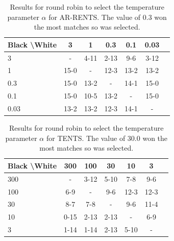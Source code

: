     \begin{table}[]
    \centering
        \begin{tabular}{l|cccccc}
            \textbf{Black \textbackslash White}     & 3  & 1   & 0.3   & 0.1    & 0.03    \\ 
            \hline
                                    3            & -     	&  4-11 		&  2-13 		& 9-6  		& 3-12  		\\
                                    1            &  15-0 		& -     	&  12-3		& 13-2  		&   13-2		\\
                                    0.3          &  15-0  	&  13-2  	&   -   &  14-1 		&  15-0 		\\
                                    0.1          &  15-0 		&   10-5		&   13-2		& -     	&  15-0 		\\
                                    0.03         &  13-2 		&  13-2 		&  12-3 		&   	14-1	&   -   	\\    
        \end{tabular}
        \caption{Results for round robin to select the temperature parameter $\alpha$ for AR-RENTS. The value of 0.3 won the most matches so was selected. \label{tab:x050}}
    \end{table}
    
    \begin{table}[]
    \centering
        \begin{tabular}{l|cccccc}
            \textbf{Black \textbackslash White}     & 300  & 100   & 30   & 10    & 3    \\ 
            \hline
                                    300            & -     	&  3-12 		&  5-10 		&  7-8 		& 9-6  		\\
                                    100            &  6-9 		& -     	&  9-6		&  12-3 		& 12-3  		\\
                                    30          & 8-7   	&  7-8  	&   -   &  9-6 		&  11-4 		\\
                                    10          &  0-15 		&  2-13 		& 2-13  		& -     	& 6-9  		\\
                                    3         &  1-14 		& 1-14  		& 2-13  		&  5-10 		&   -   	\\    
        \end{tabular}
        \caption{Results for round robin to select the temperature parameter $\alpha$ for TENTS. The value of 30.0 won the most matches so was selected. \label{tab:w060}}
    \end{table}
    
